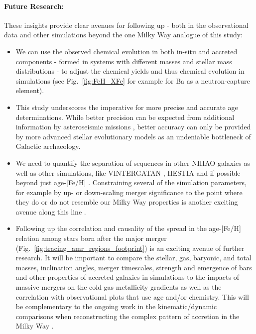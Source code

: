 \documentclass[fleqn,usenatbib]{mnras}
\begin{document}
\paragraph*{Future Research:}
These insights provide clear avenues for following up - both in the observational data and other simulations beyond the one Milky Way analogue of this study:
\begin{itemize}
    \item We can use the observed chemical evolution in both in-situ and accreted components - formed in systems with different masses and stellar mass distributions - to adjust the chemical yields and thus chemical evolution in simulations (see Fig.~\ref{fig:FeH_XFe} for example for Ba as a neutron-capture element).
    \item This study underscores the imperative for more precise and accurate age determinations. While better precision can be expected from additional information by asteroseismic missions \citep[see e.g.][]{Miglio2017,Mackereth2021}, better accuracy can only be provided by more advanced stellar evolutionary models \citep[see also][]{Kim2002, Schuster2012} as an undeniable bottleneck of Galactic archaeology.
    \item We need to quantify the separation of sequences in other NIHAO galaxies \citep[see e.g.][]{Lu2022, Buck2023} as well as other simulations, like \textsc{VINTERGATAN} \citep{Renaud2021, Renaud2021b, Agertz2021}, \textsc{HESTIA} \citep{Khoperskov2023, Khoperskov2023b, Khoperskov2023c} and if possible beyond just age-[Fe/H] \citep{Khoperskov2023c}. Constraining several of the simulation parameters, for example by up- or down-scaling merger significance to the point where they do or do not resemble our Milky Way properties is another exciting avenue along this line \cite{Rey2023}.
    \item Following up the correlation and causality of the spread in the age-[Fe/H] relation among stars born after the major merger (Fig.~\ref{fig:tracing_amr_regions_footprint}) is an exciting avenue of further research. It will be important to compare the stellar, gas, baryonic, and total masses, inclination angles, merger timescales, strength and emergence of bars and other properties of accreted galaxies in simulations to the impacts of massive mergers on the cold gas metallicity gradients \citep{Buck2023} as well as the correlation with observational plots that use age and/or chemistry. This will be complementary to the ongoing work in the kinematic/dynamic comparisons \citep[e.g.][]{Naidu2021, Khoperskov2023b} when reconstructing the complex pattern of accretion in the Milky Way \citep{Naidu2020}.
\end{itemize}
\end{document}
